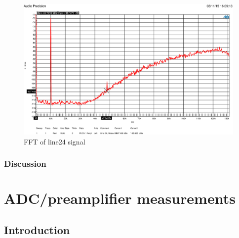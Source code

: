 \documentclass[11pt]{report}
\begin{document}
\begin{figure}[htbp]
\begin{center}
\includegraphics[width=14cm,keepaspectratio=true]{FFTrauschen}
\caption{FFT of line24 signal}
\label{Abb.:1}
\end{center}
\end{figure}

	\subsection{Discussion}


\chapter{ADC/preamplifier measurements}
\section{Introduction}
\end{document}
